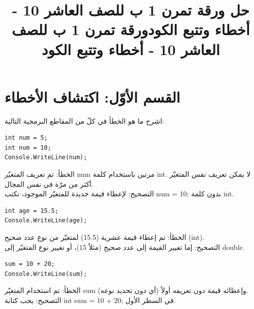 \documentclass[14pt]{extarticle}
\title{حل ورقة تمرن 1 ب للصف العاشر 10 - أخطاء وتتبع الكود}
\title{ورقة تمرن 1 ب للصف العاشر 10 - أخطاء وتتبع الكود}
\begin{document}
\maketitle
\thispagestyle{fancy}

\section*{القسم الأوّل: اكتشاف الأخطاء}
اشرح ما هو الخطأ في كلّ من المقاطع البرمجية التالية:

\begin{enumerate}[itemsep=2em]

\begin{english}
\item
\begin{verbatim}
int num = 5;
int num = 10;
Console.WriteLine(num);
\end{verbatim}
\end{english}
\ifwithsols
\begin{boxSolution}
الخطأ: تم تعريف المتغيّر \textenglish{num} مرتين باستخدام كلمة \textenglish{int}. لا يمكن تعريف نفس المتغيّر أكثر من مرّة في نفس المجال. \\
التصحيح: لإعطاء قيمة جديدة للمتغيّر الموجود، نكتب \textenglish{num = 10;} بدون كلمة \textenglish{int}.
\end{boxSolution}
\fi

\begin{english}
    \item
\begin{verbatim}
int age = 15.5;
Console.WriteLine(age);
\end{verbatim}
\end{english}
\ifwithsols
\begin{boxSolution}
الخطأ: تم إعطاء قيمة عشرية \textenglish{(15.5)} لمتغيّر من نوع عدد صحيح \textenglish{(int)}. \\
التصحيح: إما تغيير القيمة إلى عدد صحيح (مثلاً 15)، أو تغيير نوع المتغيّر إلى \textenglish{double}.
\end{boxSolution}
\fi

\begin{english}
    \item
\begin{verbatim}
sum = 10 + 20;
Console.WriteLine(sum);
\end{verbatim}
\end{english}
\ifwithsols
\begin{boxSolution}
الخطأ: تم استخدام المتغيّر \textenglish{sum} وإعطائه قيمة دون تعريفه أولاً (أي دون تحديد نوعه). \\
التصحيح: يجب كتابة \textenglish{int sum = 10 + 20;} في السطر الأول.
\end{boxSolution}
\fi


\end{enumerate}
\end{document}
